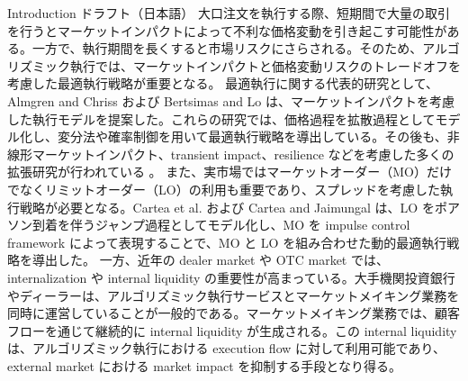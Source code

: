 Introduction ドラフト（日本語）
大口注文を執行する際、短期間で大量の取引を行うとマーケットインパクトによって不利な価格変動を引き起こす可能性がある。一方で、執行期間を長くすると市場リスクにさらされる。そのため、アルゴリズミック執行では、マーケットインパクトと価格変動リスクのトレードオフを考慮した最適執行戦略が重要となる。
最適執行に関する代表的研究として、Almgren and Chriss \cite{almgren2001optimal} および Bertsimas and Lo \cite{bertsimas1998optimal} は、マーケットインパクトを考慮した執行モデルを提案した。これらの研究では、価格過程を拡散過程としてモデル化し、変分法や確率制御を用いて最適執行戦略を導出している。その後も、非線形マーケットインパクト、transient impact、resilience などを考慮した多くの拡張研究が行われている \cite{dang2017optimal,gatheral2011exponential,gatheral2012transient,curato2017optimal}。
また、実市場ではマーケットオーダー（MO）だけでなくリミットオーダー（LO）の利用も重要であり、スプレッドを考慮した執行戦略が必要となる。Cartea et al. \cite{cartea2015algorithmic} および Cartea and Jaimungal \cite{cartea2015optimal} は、LO をポアソン到着を伴うジャンプ過程としてモデル化し、MO を impulse control framework によって表現することで、MO と LO を組み合わせた動的最適執行戦略を導出した。
一方、近年の dealer market や OTC market では、internalization や internal liquidity の重要性が高まっている。大手機関投資銀行やディーラーは、アルゴリズミック執行サービスとマーケットメイキング業務を同時に運営していることが一般的である。マーケットメイキング業務では、顧客フローを通じて継続的に internal liquidity が生成される。この internal liquidity は、アルゴリズミック執行における execution flow に対して利用可能であり、external market における market impact を抑制する手段となり得る。

